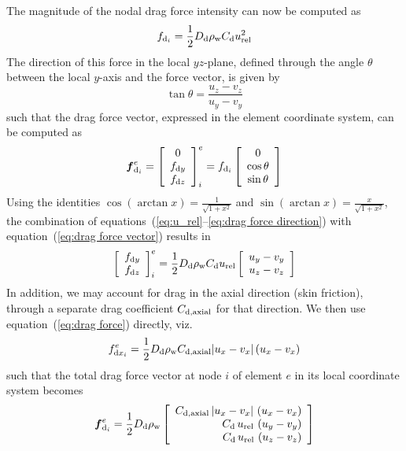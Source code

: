 The magnitude of the nodal drag force intensity can now be computed as
%
\begin{equation}
\label{eq:drag force magnitude}
f_{{\rm d}_i} = \frac{1}{2}D_{\rm d} \rho_{\rm w} C_{\rm d} u_{\rm rel}^2
\end{equation}
%
The direction of this force in the local $yz$-plane, defined through the angle
$\theta$ between the local $y$-axis and the force vector, is given by
%
\begin{equation}
\label{eq:drag force direction}
\tan\theta = \frac{u_z - v_z}{u_y - v_y}
\end{equation}
%
such that the drag force vector, expressed in the element coordinate system,
can be computed as
%
\begin{equation}
\label{eq:drag force vector}
\mbox{\boldmath $f$}_{{\rm d}_i}^e = \left[\begin{array}{c}
0 \\ f_{{\rm d}y} \\ f_{{\rm d}z} \end{array}\right]_i^e =
f_{{\rm d}_i} \left[\begin{array}{c}
0 \\ \cos\theta \\ \sin\theta \end{array}\right]
\end{equation}
%
Using the identities $\cos(\arctan x) = \frac{1}{\sqrt{1+x^2}}$
and $\sin(\arctan x) = \frac{x}{\sqrt{1+x^2}}$, the combination of
equations~(\ref{eq:u_rel}--\ref{eq:drag force direction}) with
equation~(\ref{eq:drag force vector}) results in
%
\begin{equation}
\left[\begin{array}{c}
f_{{\rm d}y} \\ f_{{\rm d}z} \end{array}\right]_i^e =
\frac{1}{2}D_{\rm d} \rho_{\rm w} C_{\rm d} u_{\rm rel}
\left[\begin{array}{c} u_y - v_y \\ u_z - v_z \end{array}\right]
\end{equation}
%
In addition, we may account for drag in the axial direction (skin friction),
through a separate drag coefficient $C_{\rm d,axial}$ for that direction.
We then use equation~(\ref{eq:drag force}) directly, viz.
%
\begin{equation}
f_{{{\rm d}x}_i}^e = \frac{1}{2}D_{\rm d}\rho_{\rm w}C_{\rm d,axial}|u_x-v_x|\left(u_x-v_x\right)
\end{equation}
%
such that the total drag force vector at node $i$ of element $e$ in its local
coordinate system becomes
%
\begin{equation}
\label{eq:local drag force vector}
\mbox{\boldmath $f$}_{{\rm d}_i}^e = \frac{1}{2}D_{\rm d}\rho_{\rm w} \left[\begin{array}{r}
C_{\rm d,axial}\, |u_x-v_x|\,\left(u_x-v_x\right) \\
C_{\rm d}\, u_{\rm rel}\, \left(u_y-v_y\right) \\
C_{\rm d}\, u_{\rm rel}\, \left(u_z-v_z\right) \end{array}\right]
\end{equation}

